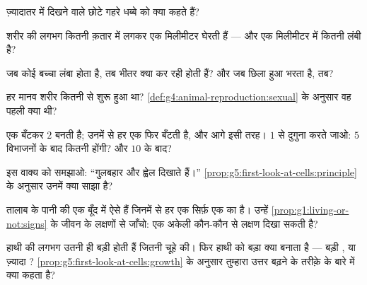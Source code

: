 \begin{exercise}[$\star$]\label{exo:g5:first-look-at-cells:4}
ज़्यादातर  में दिखने वाले छोटे गहरे धब्बे को क्या कहते हैं?
\end{exercise}

\begin{exercise}[$\star$]\label{exo:g5:first-look-at-cells:5}
शरीर की लगभग कितनी  क़तार में लगकर एक मिलीमीटर घेरती हैं ---
और एक  मिलीमीटर में कितनी लंबी है?
\end{exercise}

\begin{exercise}[$\star$]\label{exo:g5:first-look-at-cells:6}
जब कोई बच्चा लंबा होता है, तब भीतर  क्या कर रही होती हैं? और
जब छिला हुआ  भरता है, तब?
\end{exercise}

\begin{exercise}[$\star$]\label{exo:g5:first-look-at-cells:7}
हर मानव शरीर कितनी  से शुरू हुआ था?
\cref{def:g4:animal-reproduction:sexual} के अनुसार वह पहली  क्या
थी?
\end{exercise}

\begin{exercise}[$\star$]\label{exo:g5:first-look-at-cells:8}
एक  बँटकर $2$ बनती है; उनमें से हर एक फिर बँटती है, और आगे इसी
तरह। $1$ से दुगुना करते जाओ: $5$ विभाजनों के बाद कितनी  होंगी?
और $10$ के बाद?
\end{exercise}

\begin{exercise}[$\star\star$]\label{exo:g5:first-look-at-cells:9}
इस वाक्य को समझाओ: ``गुलबहार और ह्वेल  दिखाते हैं।''
\cref{prop:g5:first-look-at-cells:principle} के अनुसार उनमें क्या साझा
है?
\end{exercise}

\begin{exercise}[$\star\star$]\label{exo:g5:first-look-at-cells:10}
तालाब के पानी की एक बूँद में ऐसे  हैं जिनमें से हर एक सिर्फ़ एक
 का है। उन्हें \cref{prop:g1:living-or-not:signs} के जीवन के
लक्षणों से जाँचो: एक अकेली  कौन-कौन से लक्षण दिखा सकती है?
\end{exercise}

\begin{exercise}[$\star\star\star$]\label{exo:g5:first-look-at-cells:11}
हाथी की  लगभग उतनी ही बड़ी होती हैं जितनी चूहे की। फिर हाथी को
बड़ा क्या बनाता है --- बड़ी , या ज़्यादा ?
\cref{prop:g5:first-look-at-cells:growth} के अनुसार तुम्हारा उत्तर
बढ़ने के तरीक़े के बारे में क्या कहता है?
\end{exercise}
